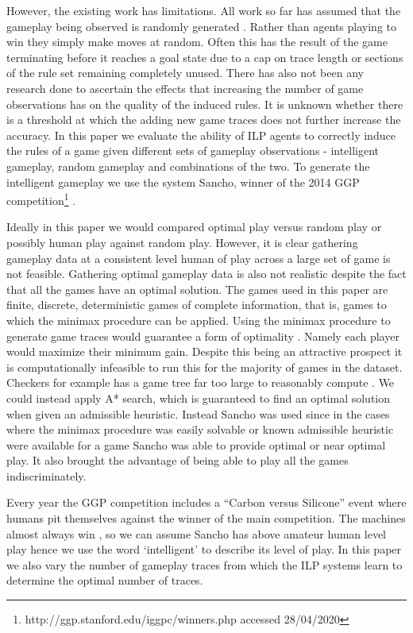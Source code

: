 However, the existing work has limitations. All work so far has assumed that the gameplay being observed is randomly generated \cite{Cropper/IGGP}. Rather than agents playing to win they simply make moves at random. Often this has the result of the game terminating before it reaches a goal state due to a cap on trace length or sections of the rule set remaining completely unused. There has also not been any research done to ascertain the effects that increasing the number of game observations has on the quality of the induced rules. It is unknown whether there is a threshold at which the adding new game traces does not further increase the accuracy. In this paper we evaluate the ability of ILP agents to correctly induce the rules of a game given different sets of gameplay observations - intelligent gameplay, random gameplay and combinations of the two. To generate the intelligent gameplay we use the system Sancho, winner of the 2014 GGP competition\footnote{http://ggp.stanford.edu/iggpc/winners.php accessed 28/04/2020} \cite{Sancho/Github}. 

Ideally in this paper we would compared optimal play versus random play or possibly human play against random play. However, it is clear gathering gameplay data at a consistent level human of play across a large set of game is not feasible. Gathering optimal gameplay data is also not realistic despite the fact that all the games have an optimal solution. The games used in this paper are finite, discrete, deterministic games of complete information, that is, games to which the minimax procedure can be applied. Using the minimax procedure to generate game traces would guarantee a form of optimality \cite{IntroToAlgorithms}. Namely each player would maximize their minimum gain. Despite this being an attractive prospect it is computationally infeasible to run this for the majority of games in the dataset. Checkers for example has a game tree far too large to reasonably compute \cite{Schaeffer/Checkers}. We could instead apply A* search, which is guaranteed to find an optimal solution when given an admissible heuristic. Instead Sancho was used since in the cases where the minimax procedure was easily solvable or known admissible heuristic were available for a game Sancho was able to provide optimal or near optimal play. It also brought the advantage of being able to play all the games indiscriminately.

Every year the GGP competition includes a ``Carbon versus Silicone'' event where humans pit themselves against the winner of the main competition. The machines almost always win \cite{Genesereth/GGPOverview}, so we can assume Sancho has above amateur human level play hence we use the word `intelligent' to describe its level of play. In this paper we also vary the number of gameplay traces from which the ILP systems learn to determine the optimal number of traces.


